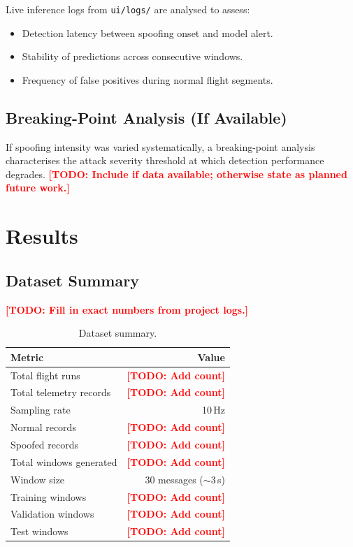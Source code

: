 \documentclass[11pt,a4paper]{article}
\newcommand{\todo}[1]{\textcolor{red}{\textbf{[TODO: #1]}}}
\begin{document}
Live inference logs from \texttt{ui/logs/} are analysed to assess:
\begin{itemize}
    \item Detection latency between spoofing onset and model alert.
    \item Stability of predictions across consecutive windows.
    \item Frequency of false positives during normal flight segments.
\end{itemize}

\subsection{Breaking-Point Analysis (If Available)}

If spoofing intensity was varied systematically, a breaking-point analysis characterises the attack severity threshold at which detection performance degrades. \todo{Include if data available; otherwise state as planned future work.}

\section{Results}

\subsection{Dataset Summary}

\todo{Fill in exact numbers from project logs.}

\begin{table}[H]
\centering
\caption{Dataset summary.}
\label{tab:dataset}
\begin{tabular}{@{}lr@{}}
\toprule
\textbf{Metric} & \textbf{Value} \\
\midrule
Total flight runs & \todo{Add count} \\
Total telemetry records & \todo{Add count} \\
Sampling rate & 10\,Hz \\
Normal records & \todo{Add count} \\
Spoofed records & \todo{Add count} \\
Total windows generated & \todo{Add count} \\
Window size & 30 messages ($\sim$3\,s) \\
Training windows & \todo{Add count} \\
Validation windows & \todo{Add count} \\
Test windows & \todo{Add count} \\
\bottomrule
\end{tabular}
\end{table}
\end{document}
